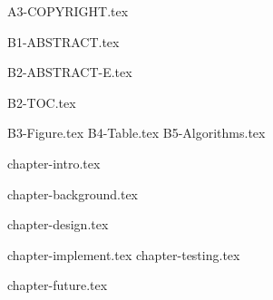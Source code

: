 \documentclass[12pt,openany,a4paper,fancyhdr,twoside]{ctexbook}
\newcommand{\clearPaperPage}{\clearpage}
\newcommand{\banxiaosi}{\fontsize{13pt}{19.5pt}\selectfont}    %
\newcommand{\xiaosi}{\fontsize{12pt}{18pt}\selectfont}            %
\begin{document}

\clearPaperPage



\clearPaperPage
 {A3-COPYRIGHT.tex}

\clearPaperPage




\clearPaperPage
{}
\pagestyle{plain}



 {B1-ABSTRACT.tex}

\clearPaperPage
 {B2-ABSTRACT-E.tex}
\clearPaperPage



 {B2-TOC.tex}

\clearPaperPage

 {B3-Figure.tex}
\clearPaperPage
 {B4-Table.tex}
\clearPaperPage
 {B5-Algorithms.tex}







\clearPaperPage
{}
\pagestyle{fancy}
\fancyhead[RE,LO]{ \leftmark}





\setlength{\baselineskip}{25pt}  %





\raggedbottom
\xiaosi
\clearPaperPage

 {chapter-intro.tex}
\clearPaperPage


 {chapter-background.tex}
\clearPaperPage



\clearPaperPage
 {chapter-design.tex}

\cleardoublepage
 {chapter-implement.tex}
\clearPaperPage
 {chapter-testing.tex}
\clearPaperPage


\clearPaperPage

 {chapter-future.tex}
\end{document}

